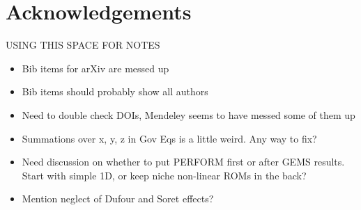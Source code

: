 \chapter{Acknowledgements}

{\color{red}
USING THIS SPACE FOR NOTES
\begin{itemize}
	\item Bib items for arXiv are messed up
	\item Bib items should probably show all authors
	\item Need to double check DOIs, Mendeley seems to have messed some of them up
	\item Summations over x, y, z in Gov Eqs is a little weird. Any way to fix?
	\item Need discussion on whether to put PERFORM first or after GEMS results. Start with simple 1D, or keep niche non-linear ROMs in the back?
	\item Mention neglect of Dufour and Soret effects?
\end{itemize}

}